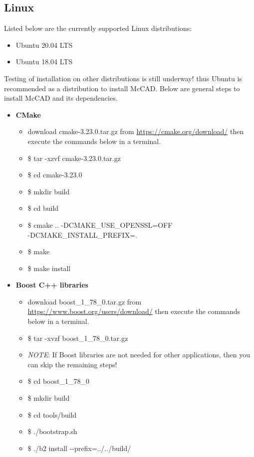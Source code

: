 \documentclass[12pt, a4paper, titlepage]{article}
\begin{document}
  \subsection{Linux}
    Listed below are the currently supported Linux distributions:
    \begin{itemize}
  	  \item Ubuntu 20.04 LTS
  	  \item Ubuntu 18.04 LTS
    \end{itemize} 
    Testing of installation on other distributions is still underway! thus Ubuntu is recommended as a distribution to install McCAD. Below are general steps to install McCAD and its dependencies.
    \begin{itemize}
  	  \item \textbf{CMake}
  	  \begin{itemize}
		\item download cmake-3.23.0.tar.gz from \url{https://cmake.org/download/} then execute the commands below in a terminal.
		\item \$ tar -xzvf cmake-3.23.0.tar.gz
		\item \$ cd cmake-3.23.0
		\item \$ mkdir build
		\item \$ cd build
		\item \$ cmake .. -DCMAKE\_USE\_OPENSSL=OFF \\-DCMAKE\_INSTALL\_PREFIX=.
		\item \$ make
		\item \$ make install
  	  \end{itemize}
      \item \textbf{Boost C++ libraries}
      \begin{itemize}
    	\item download boost\_1\_78\_0.tar.gz from \url{https://www.boost.org/users/download/} then execute the commands below in a terminal.
    	\item \$ tar -xvzf boost\_1\_78\_0.tar.gz
    	\item \emph{NOTE}: If Boost libraries are not needed for other applications, then you can skip the remaining steps!
    	\item \$ cd boost\_1\_78\_0
    	\item \$ mkdir build
    	\item \$ cd tools/build
    	\item \$ ./bootstrap.sh
    	\item \$ ./b2 install -\--prefix=../../build/
      \end{itemize}

\end{itemize}
\end{document}
